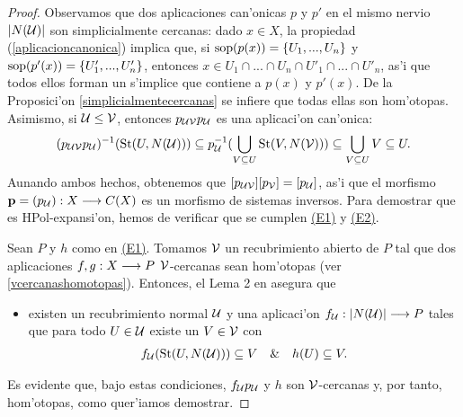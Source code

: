 \begin{proof}
    Observamos que dos aplicaciones can'onicas $ p  $ y $ p'  $ en el mismo nervio $ \abs{N(\mathcal{U} )} $ son simplicialmente cercanas: dado $ x\in X  $, la propiedad (\ref{aplicacioncanonica}) implica que, si $ \operatorname{sop}(p(x)) = \{U_1,...,U_n \} $ y $ \operatorname{sop}(p'(x)) = \{U'_1,...,U'_n \} $, entonces $ x\in U_1\cap...\cap U_n \cap U'_1\cap...\cap U'_n  $, as'i que todos ellos forman un s'implice que contiene a $ p(x) $ y $ p'(x) $. De la Proposici'on \ref{simplicialmentecercanas} se infiere que todas ellas son hom'otopas. Asimismo, si $ \mathcal{U} \leq \mathcal{V}  $, entonces $ p_{\mathcal{U}\mathcal{V} }p_{\mathcal{U}}  $ es una aplicaci'on can'onica: 
    \begin{gather*}
      (p_{\mathcal{U}\mathcal{V}}p_{\mathcal{U}})^{-1} (\operatorname{St}(U,N(\mathcal{U}))) \subseteq p_{\mathcal{U}}^{-1} (\bigcup_{V\subseteq U } \operatorname{St} (V,N(\mathcal{V} ))) \subseteq \bigcup_{V\subseteq U }V \subseteq U .
    \end{gather*}
    Aunando ambos hechos, obtenemos que $ [p_{\mathcal{U}\mathcal{V} }][p_{\mathcal{V} }] = [p_{\mathcal{U} } ]$, as'i que el morfismo $ \mathbf{p} = (p_{\mathcal{U}}):X\longrightarrow C(X ) $ es un morfismo de sistemas inversos. Para demostrar que es HPol-expansi'on, hemos de verificar que se cumplen \hyperref[e1]{(E1)} y \hyperref[e2]{(E2)}. 

    Sean $ P $ y $ h  $ como en \hyperref[e1]{(E1)}. Tomamos $ \mathcal{V}  $ un recubrimiento abierto de $ P $ tal que dos aplicaciones $ f,g:X \longrightarrow P  $ $ \mathcal{V}  $-cercanas sean hom'otopas (ver \ref{vcercanashomotopas}). Entonces, el Lema 2 en \cite[p. 316]{mardešić1982shape} asegura que 
    \begin{itemize}
      \item[] existen un recubrimiento normal $ \mathcal{U}  $ y una aplicaci'on $ f_{\mathcal{U}} :\abs{N(\mathcal{U} )}\longrightarrow P  $ tales que para todo $ U\in \mathcal{U}  $ existe un $ V\in \mathcal{V}  $ con 
      \begin{gather*}
        f_{\mathcal{U}} (\operatorname{St}(U,N(\mathcal{U})))\subseteq V \quad \&  \quad h(U)\subseteq V.
      \end{gather*}
    \end{itemize}
    Es evidente que, bajo estas condiciones, $ f_{\mathcal{U}} p_{\mathcal{U}}$  y $ h  $ son $ \mathcal{V}  $-cercanas y, por tanto, hom'otopas, como quer'iamos demostrar.


\end{proof}
